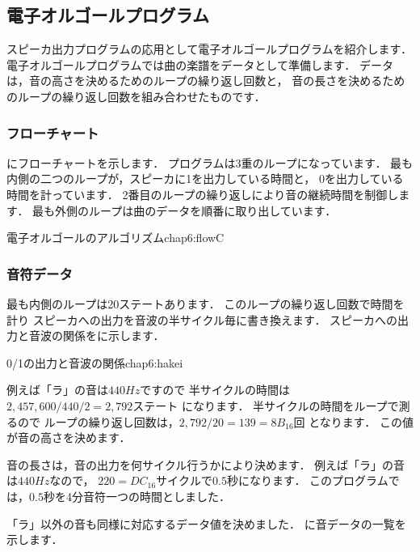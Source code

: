 \newpage
\subsection{電子オルゴールプログラム}
スピーカ出力プログラムの応用として電子オルゴールプログラムを紹介します．
電子オルゴールプログラムでは曲の楽譜をデータとして準備します．
データは，音の高さを決めるためのループの繰り返し回数と，
音の長さを決めるためのループの繰り返し回数を組み合わせたものです．

\subsubsection{フローチャート}
にフローチャートを示します．
プログラムは3重のループになっています．
最も内側の二つのループが，スピーカに1を出力している時間と，
0を出力している時間を計っています．
2番目のループの繰り返しにより音の継続時間を制御します．
最も外側のループは曲のデータを順番に取り出しています．

{電子オルゴールのアルゴリズム}{chap6:flowC}

\subsubsection{音符データ}
最も内側のループは20ステートあります．
このループの繰り返し回数で時間を計り
スピーカへの出力を音波の半サイクル毎に書き換えます．
スピーカへの出力と音波の関係をに示します．

{0/1の出力と音波の関係}{chap6:hakei}

例えば「ラ」の音は$440Hz$ですので
半サイクルの時間は $2,457,600 / 440 / 2 = 2,792ステート$ になります．
半サイクルの時間をループで測るので
ループの繰り返し回数は，$2,792 / 20 = 139 = 8B_{16}回$ となります．
この値が音の高さを決めます．

音の長さは，音の出力を何サイクル行うかにより決めます．
例えば「ラ」の音は$440Hz$なので，
$220=DC_{16}サイクル$で$0.5秒$になります．
このプログラムでは，$0.5秒$を4分音符一つの時間としました．

「ラ」以外の音も同様に対応するデータ値を決めました．
に音データの一覧を示します．

